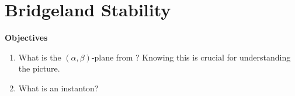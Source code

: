 \section{Bridgeland Stability}
\label{section-Bridgeland-stability}

{\bf Objectives}
\begin{enumerate}
\item What is the $(\alpha,\beta)$-plane from \cite{wall-crossing}? Knowing this
is crucial for understanding the picture.
\item What is an instanton?
\end{enumerate}






